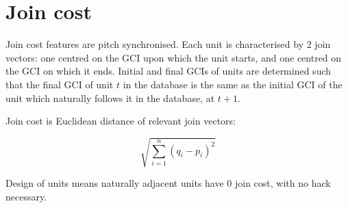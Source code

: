 
\section{Join cost}

Join cost features are pitch synchronised. Each unit is characterised by 2 join vectors: one centred on the GCI upon which the unit starts, and one centred on the GCI on which it ends. Initial and final GCIs of units are determined such that the final GCI of unit $t$ in the database is the same as the initial GCI of the unit which naturally follows it in the database, at $t+1$.

Join cost is Euclidean distance of relevant join vectors:

\begin{equation}
\sqrt{\sum_{i=1}^{n}(q_i - p_i)^{2}}
\end{equation}

Design of units means naturally adjacent units have 0 join cost, with no hack necessary.


